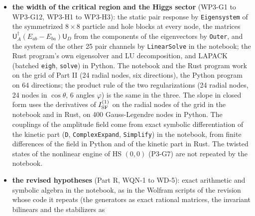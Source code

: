 \documentclass[
  10pt,
]{article}
\begin{document}
\begin{itemize}
  the symmetrized \(16\times16\) matrices on the grid of Part II in the
  notebook, by the Rust program's own eigensolver and by LAPACK in
  Python; the critical temperatures by bisection, in the notebook with
  the Dirac mass of the normal state from its scalar self-consistency
  alone (and, for the three methods with a scalar coupling, compared
  with the normal state of the thermal engine), in Rust and Python with
  the normal state of the engine (and, in Python's YP3-T9, also from the
  scalar self-consistency); the Taylor coefficients by
  \texttt{LinearSolve} of the cubic interpolation in the scaled variable
  \(\Phi^2/\Phi^2_{\max}\) (Gaussian elimination in Rust,
  \texttt{numpy.linalg.solve} in Python); the residuals of the Landau
  forms of the Rust free-energy curves by \texttt{LeastSquares}
  (Householder reflections in Rust, the singular-value decomposition in
  Python);
\item
  \textbf{the width of the critical region and the Higgs sector} (WP3-G1
  to WP3-G12, WP3-H1 to WP3-H3): the static pair response by
  \texttt{Eigensystem} of the symmetrized \(8\times8\) particle and hole
  blocks at every node, the matrices
  \(\mathsf U_A^\dagger(E_{ab}-E_{ba})\mathsf U_D\) from the components
  of the eigenvectors by \texttt{Outer}, and the system of the other 25
  pair channels by \texttt{LinearSolve} in the notebook; the Rust
  program's own eigensolver and LU decomposition, and LAPACK (batched
  \texttt{eigh}, \texttt{solve}) in Python. The notebook and the Rust
  program work on the grid of Part II (24 radial nodes, six directions),
  the Python program on 64 directions; the product rule of the two
  regularizations (24 radial nodes, 24 nodes in \(\cos\theta\), 6 angles
  \(\varphi\)) is the same in the three. The slope in closed form uses
  the derivatives of \(I^{(1)}_{\rm SF}\) on the radial nodes of the
  grid in the notebook and in Rust, on 400 Gauss-Legendre nodes in
  Python. The couplings of the amplitude field come from exact symbolic
  differentiation of the kinetic part (\texttt{D},
  \texttt{ComplexExpand}, \texttt{Simplify}) in the notebook, from
  finite differences of the field in Python and of the kinetic part in
  Rust. The twisted states of the nonlinear engine of HS \((0,0)\)
  (P3-G7) are not repeated by the notebook.
\item
  \textbf{the revised hypotheses} (Part R, WQN-1 to WD-5): exact
  arithmetic and symbolic algebra in the notebook, as in the Wolfram
  scripts of the revision whose code it repeats (the generators as exact
  rational matrices, the invariant bilinears and the stabilizers as

\end{itemize}
\end{document}
